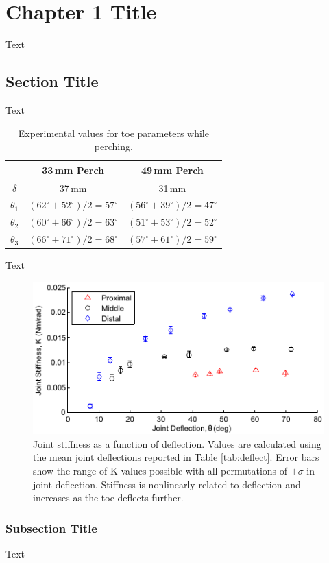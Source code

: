\chapter{Chapter 1 Title}\label{chap1}

Text

\section{Section Title}  %
Text 
   \begin{table}[b]
    \caption{Experimental values for toe parameters while perching.}
    \label{tab:footData}
    \begin{center}
    \begin{tabular}{c|c|c|}
      \cline{2-3}
      {} & \textbf{33\,mm Perch} & \textbf{49\,mm Perch} \\\hline
      \multicolumn{1}{|c|}{\textbf{$\delta$}} & 37\,mm & 31\,mm \\
      \multicolumn{1}{|c|}{\textbf{$\theta_1$}} & $(62^\circ+52^\circ)/2=57^\circ$ & $(56^\circ+39^\circ)/2=47^\circ$ \\
      \multicolumn{1}{|c|}{\textbf{$\theta_2$}} & $(60^\circ+66^\circ)/2=63^\circ$ & $(51^\circ+53^\circ)/2=52^\circ$ \\
      \multicolumn{1}{|c|}{\textbf{$\theta_3$}} & $(66^\circ+71^\circ)/2=68^\circ$ & $(57^\circ+61^\circ)/2=59^\circ$ \\
      \hline
    \end{tabular}
    \end{center}
   \end{table}
Text 
   \begin{figure}[t]
      \centering
      \includegraphics[width=.7\textwidth]{chap1img/jointDeflection4.pdf}
      \caption[Joint stiffness as a function of deflection]{Joint stiffness as a function of deflection. Values are calculated using the mean joint deflections reported in Table \ref{tab:deflect}. Error bars show the range of K values possible with all permutations of $\pm\sigma$ in joint deflection. Stiffness is nonlinearly related to deflection and increases as the toe deflects further.}
      \label{fig:jointDeflect}
   \end{figure}

\subsection{Subsection Title} %
Text  
